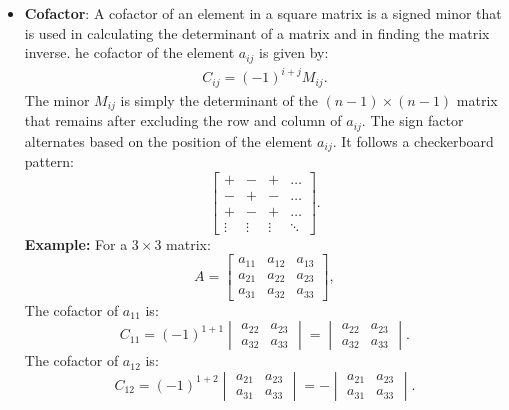 \documentclass{report}
\begin{document}
\begin{itemize}
    \item \textbf{Cofactor}: A cofactor of an element in a square matrix is a signed minor that is used in calculating the determinant of a matrix and in finding the matrix inverse.
        \bigbreak \noindent 
        he cofactor of the element $a_{ij}$ is given by:
        \begin{align*}
            C_{ij} = (-1)^{i+j}M_{ij}
        .\end{align*}
        \bigbreak \noindent 
         The minor \( M_{ij} \) is simply the determinant of the \( (n-1) \times (n-1) \) matrix that remains after excluding the row and column of \( a_{ij} \).
        \bigbreak \noindent 
        The sign factor alternates based on the position of the element \( a_{ij} \). It follows a checkerboard pattern:
        \[
            \begin{bmatrix}
                + & - & + & \dots \\
                - & + & - & \dots \\
                + & - & + & \dots \\
                \vdots & \vdots & \vdots & \ddots
            \end{bmatrix}.
        \]
        \bigbreak \noindent 
        \textbf{Example:} 
        For a \( 3 \times 3 \) matrix:
        \[
            A = \begin{bmatrix}
                a_{11} & a_{12} & a_{13} \\
                a_{21} & a_{22} & a_{23} \\
                a_{31} & a_{32} & a_{33}
            \end{bmatrix},
        \]
        The cofactor of \( a_{11} \) is:
        \[
            C_{11} = (-1)^{1+1} \begin{vmatrix}
                a_{22} & a_{23} \\
                a_{32} & a_{33}
                \end{vmatrix} = \begin{vmatrix}
                a_{22} & a_{23} \\
                a_{32} & a_{33}
            \end{vmatrix}.
        \]
        The cofactor of \( a_{12} \) is:
        \[
            C_{12} = (-1)^{1+2} \begin{vmatrix}
                a_{21} & a_{23} \\
                a_{31} & a_{33}
                \end{vmatrix} = -\begin{vmatrix}
                a_{21} & a_{23} \\
                a_{31} & a_{33}
            \end{vmatrix}.
        \]


\end{itemize}
\end{document}
